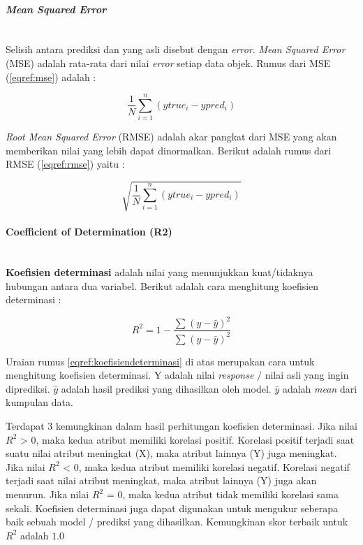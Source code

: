 \paragraph{\textit{Mean Squared Error}}  \mbox{}\\
 Selisih antara prediksi dan yang asli disebut dengan \textit{error}. \textit{Mean Squared Error} (MSE) adalah rata-rata dari nilai \textit{error} setiap data objek. Rumus dari MSE (\ref{eqref:mse}) adalah : 


\begin{equation}
  \frac{1}{N}\sum_{i=1}^{n} (y true_i - y pred_i)
  \label{eqref:mse}
\end{equation}

\textit{Root Mean Squared Error} (RMSE) adalah akar pangkat dari MSE yang akan memberikan nilai yang lebih dapat dinormalkan. Berikut adalah rumus dari RMSE (\ref{eqref:rmse}) yaitu : 

\begin{equation}
 \sqrt{\frac{1}{N}\sum_{i=1}^{n} (y true_i - y pred_i)}
  \label{eqref:rmse}
\end{equation}

\paragraph{Coefficient of Determination (R2)} \mbox{}\\

 \textbf{Koefisien determinasi} adalah nilai yang menunjukkan kuat/tidaknya hubungan antara dua variabel. Berikut adalah cara menghitung koefisien determinasi : 
		
		
		\begin{equation}
		R^2 = 1 - \frac{\sum{}^{}(y-\hat{y})^2}{\sum{}^{}(y-\bar{y})^2}
		\label{eqref:koefisiendeterminasi}		
		\end{equation}
		
Uraian rumus \eqref{eqref:koefisiendeterminasi} di atas merupakan cara untuk menghitung koefisien determinasi.  Y adalah nilai \textit{response} / nilai asli yang ingin diprediksi. $\hat{y}$ adalah hasil prediksi yang dihasilkan oleh model. $\bar{y}$ adalah \textit{mean} dari kumpulan data.

Terdapat 3 kemungkinan dalam hasil perhitungan koefisien determinasi. Jika nilai \textit{$R^2$} > 0, maka kedua atribut memiliki korelasi positif. Korelasi positif  terjadi saat suatu nilai atribut meningkat (X), maka atribut lainnya (Y) juga meningkat. Jika nilai \textit{$R^2$} < 0, maka kedua atribut memiliki korelasi negatif. Korelasi negatif terjadi saat  nilai atribut meningkat, maka atribut lainnya (Y) juga akan menurun. Jika nilai \textit{$R^2$} = 0, maka kedua atribut tidak memiliki korelasi sama sekali. Koefisien determinasi juga dapat digunakan untuk mengukur seberapa baik sebuah model / prediksi yang dihasilkan. Kemungkinan skor terbaik untuk $R^2$ adalah $1.0$
		
